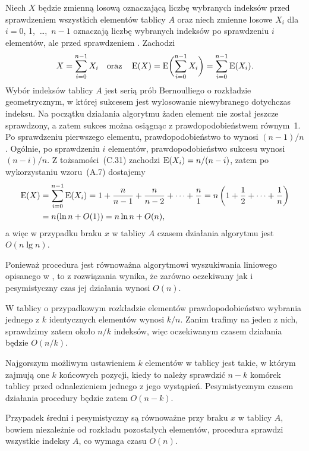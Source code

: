 \subproblem %
Niech $X$ będzie zmienną losową oznaczającą liczbę wybranych indeksów przed sprawdzeniem wszystkich elementów tablicy $A$ oraz niech zmienne losowe $X_i$ dla $i=0$, 1,~\dots,~$n-1$ oznaczają liczbę wybranych indeksów po sprawdzeniu $i$ elementów, ale przed sprawdzeniem . Zachodzi
\[
	X = \sum_{i=0}^{n-1}X_i \quad\text{oraz}\quad \operatorname{E}(X) = \operatorname{E}\biggl(\sum_{i=0}^{n-1}X_i\biggr) = \sum_{i=0}^{n-1}\operatorname{E}(X_i).
\]
Wybór indeksów tablicy $A$ jest serią prób Bernoulliego o rozkładzie geometrycznym, w której sukcesem jest wylosowanie niewybranego dotychczas indeksu. Na początku działania algorytmu żaden element nie został jeszcze sprawdzony, a zatem sukces można osiągnąc z prawdopodobieństwem równym~1. Po sprawdzeniu pierwszego elementu, prawdopodobieństwo to wynosi $(n-1)/n$. Ogólnie, po sprawdzeniu $i$ elementów, prawdopodobieństwo sukcesu wynosi $(n-i)/n$. Z tożsamości~(C.31) zachodzi $\operatorname{E}(X_i)=n/(n-i)$, zatem po wykorzystaniu wzoru~(A.7) dostajemy
\begin{align*}
	\operatorname{E}(X) &= \sum_{i=0}^{n-1}\operatorname{E}(X_i) = 1+\frac{n}{n-1}+\frac{n}{n-2}+\dots+\frac{n}{1} = n\left(1+\frac{1}{2}+\dots+\frac{1}{n}\right) \\
	&= n(\ln n+O(1)) = n\ln n+O(n),
\end{align*}
a więc w przypadku braku $x$ w tablicy $A$ czasem działania algorytmu  jest $O(n\lg n)$.

\subproblem %
Ponieważ procedura  jest równoważna algorytmowi wyszukiwania liniowego opisanego w , to z rozwiązania  wynika, że zarówno oczekiwany jak i pesymistyczny czas jej działania wynosi $O(n)$.

\subproblem %
W tablicy  o przypadkowym rozkładzie elementów prawdopodobieństwo wybrania jednego z $k$ identycznych elementów wynosi $k/n$. Zanim trafimy na jeden z nich, sprawdzimy zatem około $n/k$ indeksów, więc oczekiwanym czasem działania będzie $O(n/k)$.

Najgorszym możliwym ustawieniem $k$ elementów w tablicy  jest takie, w którym zajmują one $k$ końcowych pozycji, kiedy to należy sprawdzić $n-k$ komórek tablicy przed odnalezieniem jednego z jego wystąpień. Pesymistycznym czasem działania procedury będzie zatem $O(n-k)$.

\subproblem %
Przypadek średni i pesymistyczny są równoważne przy braku $x$ w tablicy $A$, bowiem niezależnie od rozkładu pozostałych elementów, procedura sprawdzi wszystkie indeksy $A$, co wymaga czasu $O(n)$.

